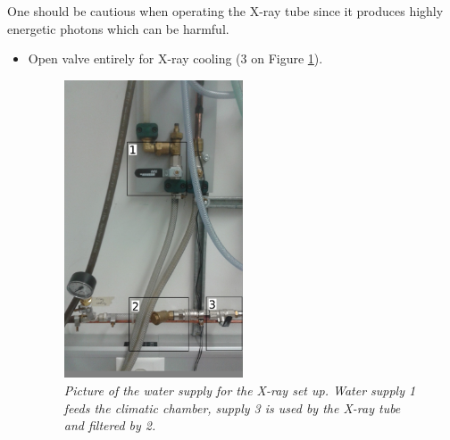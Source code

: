 \documentclass[a4paper,12pt,twoside]{article}
\begin{document}
One should be cautious when operating the X-ray tube since it produces highly energetic photons which can be harmful. 

\begin{itemize}
\item {Open valve entirely for X-ray cooling (3 on Figure \ref{Water}).
\begin{figure} [h!] \centering
\includegraphics[width=0.5\textwidth, angle=0] {./Water2.jpg}
\caption{\em  \label{Water}
Picture of the water supply for the X-ray set up. Water supply 1 feeds the climatic chamber, supply 3 is used by the X-ray tube and filtered by 2.}
\end{figure}
}


\end{itemize}
\end{document}
